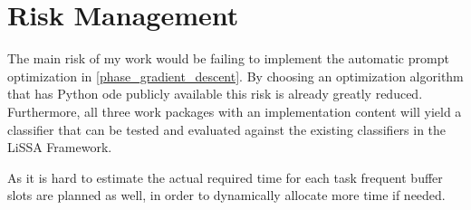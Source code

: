 \section{Risk Management}
The main risk of my work would be failing to implement the automatic prompt optimization in \ref{phase_gradient_descent}. By choosing an optimization algorithm that has Python ode publicly available this risk is already greatly reduced. Furthermore, all three work packages with an implementation content will yield a classifier that can be tested and evaluated against the existing classifiers in the LiSSA Framework. 

As it is hard to estimate the actual required time for each task frequent buffer slots are planned as well, in order to dynamically allocate more time if needed.